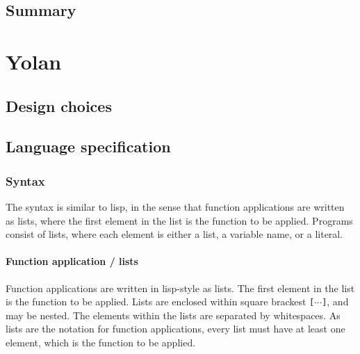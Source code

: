 \documentclass[11pt]{report}
\begin{document}
\section{Summary}
\chapter{Yolan}
\label{yolan}
\section{Design choices}
\begin{comment}
null-is-false
dynamic scope

... every expression yields a value, possibly false. Yes, you can bind a variable to the result of a false condition.

... lazy ffi.

\subsection{* Syntax}
A lisp-like syntax is choosen in order to simplify the parser and thereby reduce the code footprint.
Square brackets are used instead of parenthesis in order to indicate that the lists are not lisp-like cons-lists, but arrays. 

\section{* Implementation details}
\subsection{* AST rewriting}

\end{comment}
\section{Language specification}

\subsection{Syntax}
The syntax is similar to lisp, in the sense that function applications are written as lists, where the first element in the list is the function to be applied.
Programs consist of lists, where each element is either a list, a variable name, or a literal.

\subsubsection{Function application / lists}
Function applications are written in lisp-style as lists. The first element in the list is the function to be applied.
Lists are enclosed within square brackest \verb|[|$\cdots$\verb|]|, and may be nested. The elements within the lists are separated by whitespaces. 
As lists are the notation for function applications, every list must have at least one element, which is the function to be applied.
\end{document}
